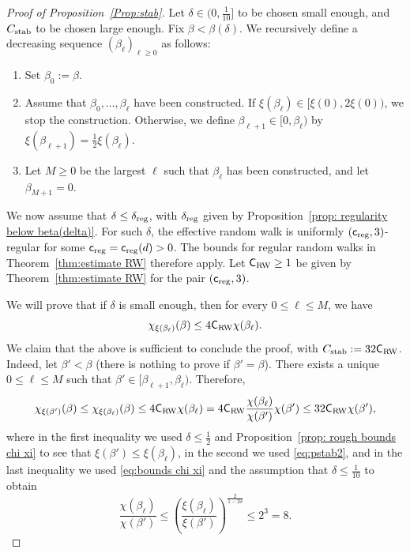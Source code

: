 \documentclass[11pt,a4paper]{article}
\numberwithin{equation}{section}
\theoremstyle{plain}
\theoremstyle{definition}
\newcommand\1{\mathds{1}}
\newcommand\Crw{\mathsf{C}_{\textup{RW}}}
\newcommand\creg{\mathsf{c}_{\textup{reg}}}
\newcommand{\Cstab}{C_{\textup{stab}}}
\newcommand{\deltareg}{\delta_{\textup{reg}}}
\begin{document}
\begin{proof}[Proof of Proposition~\textup{\ref{Prop:stab}}]
Let $\delta\in (0,\tfrac{1}{10}]$ to be chosen small enough, and $\Cstab$ to be chosen large enough. Fix $\beta<\beta(\delta)$. We recursively define a decreasing sequence $(\beta_\ell)_{\ell \geq 0}$ as follows:
\begin{enumerate}
	\item[$\bullet$] Set $\beta_0:=\beta$.
	\item[$\bullet$] Assume that $\beta_0,\ldots,\beta_\ell$ have been constructed. If $\xi(\beta_\ell)\in [\xi(0),2\xi(0))$, we stop the construction. Otherwise, we define $\beta_{\ell+1}\in [0,\beta_\ell)$ by $\xi(\beta_{\ell+1})=\tfrac{1}{2}\xi(\beta_\ell)$.
	\item[$\bullet$] Let $M\geq 0$ be the largest $\ell$ such that $\beta_\ell$ has been constructed, and let $\beta_{M+1}=0$.
\end{enumerate}
We now assume that $\delta\le \deltareg$, with $\deltareg$   given by Proposition~\ref{prop: regularity below beta(delta)}. For such $\delta$, the effective random walk is uniformly $(\creg,3)$-regular for some $\creg=\creg(d)>0$. The bounds for regular random walks in Theorem~\ref{thm:estimate RW} therefore apply.
Let $\Crw\geq 1$ be given by Theorem~\ref{thm:estimate RW} for the pair $(\creg,3)$.

We will prove that if $\delta$ is small enough, then for every $0\leq \ell\leq M$, we have
\begin{equation}\label{eq:pstab2}
	\chi_{\xi(\beta_\ell)}(\beta)\leq 4\Crw\chi(\beta_\ell).
\end{equation}
We claim that the above is sufficient to conclude the proof, with $\Cstab:=32\Crw$. Indeed, let $\beta'<\beta$ (there is nothing
to prove if $\beta'=\beta$).
There exists a unique $0\leq \ell \leq M$ such that $\beta'\in [\beta_{\ell+1},\beta_{\ell})$.
Therefore,
\begin{equation}
	\chi_{\xi(\beta')}(\beta)
\le
\chi_{\xi(\beta_{\ell})}(\beta) \le
4\Crw\chi(\beta_{\ell})=
4\Crw\frac{\chi(\beta_{\ell})}{\chi(\beta')}\chi(\beta')
\leq 32\Crw \chi(\beta'),\label{eq:pstab3}
\end{equation}
where in the first inequality we used $\delta\leq \tfrac{1}{2}$ and
Proposition~\ref{prop: rough bounds chi xi}
to see that $\xi(\beta')\leq \xi(\beta_\ell)$,
in the second we used \eqref{eq:pstab2},
and in the last inequality we used \eqref{eq:bounds chi xi} and the assumption that $\delta\leq \tfrac{1}{10}$ to obtain
\begin{equation}
	\frac{\chi(\beta_{\ell})}{\chi(\beta')}\leq \left(\frac{\xi(\beta_\ell)}{\xi(\beta')}\right)^{\tfrac{2}{1-2\delta}}\leq 2^3=8.
\end{equation}


\end{proof}
\end{document}
